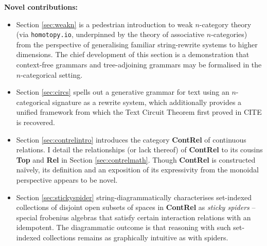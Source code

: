 


\thispagestyle{empty}%
\maketitle%


\tableofcontents{}

\clearpage
\newpage
\vfill
\begin{myboxB}
\centering
\textbf{Novel contributions:}
\begin{itemize}

\item Section \ref{sec:weakn} is a pedestrian introduction to weak $n$-category theory (via \texttt{homotopy.io}, underpinned by the theory of associative $n$-categories) from the perspective of generalising familiar string-rewrite systems to higher dimensions. The chief development of this section is a demonstration that context-free grammars and tree-adjoining grammars may be formalised in the $n$-categorical setting.

\item Section \ref{sec:circs} spells out a generative grammar for text using an $n$-categorical signature as a rewrite system, which additionally provides a unified framework from which the Text Circuit Theorem first proved in \bR CITE \e is recovered.

\item Section \ref{sec:contrelintro} introduces the category \textbf{ContRel} of continuous relations. I detail the relationships (or lack thereof) of \textbf{ContRel} to its cousins \textbf{Top} and \textbf{Rel} in Section \ref{sec:contrelmath}. Though \textbf{ContRel} is constructed na\"{i}vely, its definition and an exposition of its expressivity from the monoidal perspective appears to be novel.

\item Section \ref{sec:stickyspider} string-diagrammatically characterises set-indexed collections of disjoint open subsets of spaces in \textbf{ContRel} as \emph{sticky spiders} -- special frobenius algebras that satisfy certain interaction relations with an idempotent. The diagrammatic outcome is that reasoning with such set-indexed collections remains as graphically intuitive as with spiders.


\end{itemize}
\end{myboxB}
